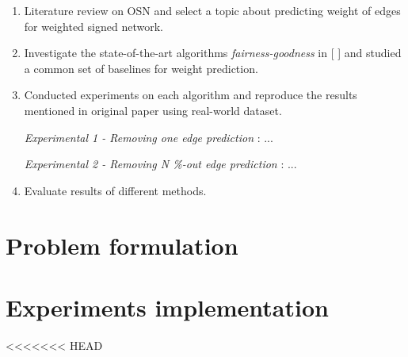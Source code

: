 \documentclass{article}
\begin{document}
\begin{enumerate}
	\item Literature review on OSN and select a topic about predicting weight of edges for weighted signed network.
	
	\item Investigate the state-of-the-art algorithms \emph{fairness-goodness} in [ ] and  studied a common set of baselines for weight prediction.
	
	\item Conducted experiments on each algorithm and reproduce the results mentioned in original paper using real-world dataset.
	
	\emph{Experimental 1 -   Removing one edge prediction} : ...
	
	\emph{Experimental 2 -  Removing N \%-out edge prediction} : ...
	
	\item Evaluate results of different methods.
\end{enumerate}

\section{Problem formulation}

\section{Experiments implementation}
















<<<<<<< HEAD








\end{document}
